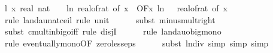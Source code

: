 \begin{isabellebody}
\ l{}{\isacharcolon}{\kern0pt}\ {\isachardoublequoteopen}{\isacharparenleft}{\kern0pt}{\isasymlambda}x{\isachardot}{\kern0pt}\ real\ {\isacharparenleft}{\kern0pt}nat\ {\isasymlceil}{\isacharminus}{\kern0pt}\ {\isacharparenleft}{\kern0pt}{}{}\ {\isacharasterisk}{\kern0pt}\ ln\ {\isacharparenleft}{\kern0pt}real{\isacharunderscore}{\kern0pt}of{\isacharunderscore}{\kern0pt}rat\ {\isacharparenleft}{\kern0pt}{\isasymepsilon}{\isacharunderscore}{\kern0pt}of\ x{\isacharparenright}{\kern0pt}{\isacharparenright}{\kern0pt}{\isacharparenright}{\kern0pt}{\isasymrceil}{\isacharparenright}{\kern0pt}{\isacharparenright}{\kern0pt}\ {\isasymin}\ O{\isacharbrackleft}{\kern0pt}{\isacharquery}{\kern0pt}F{\isacharbrackright}{\kern0pt}{\isacharparenleft}{\kern0pt}{\isasymlambda}x{\isachardot}{\kern0pt}\ ln\ {\isacharparenleft}{\kern0pt}{}\ {\isacharslash}{\kern0pt}\ real{\isacharunderscore}{\kern0pt}of{\isacharunderscore}{\kern0pt}rat\ {\isacharparenleft}{\kern0pt}{\isasymepsilon}{\isacharunderscore}{\kern0pt}of\ x{\isacharparenright}{\kern0pt}{\isacharparenright}{\kern0pt}{\isacharparenright}{\kern0pt}{\isachardoublequoteclose}\isanewline
\ \ \ \ \isamarkupfalse%
\ {\isacharparenleft}{\kern0pt}rule\ landau{\isacharunderscore}{\kern0pt}nat{\isacharunderscore}{\kern0pt}ceil{\isacharcomma}{\kern0pt}\ rule\ unit{\isacharunderscore}{\kern0pt}{}{\isacharparenright}{\kern0pt}\isanewline
\ \ \ \ \isamarkupfalse%
\ {\isacharparenleft}{\kern0pt}subst\ minus{\isacharunderscore}{\kern0pt}mult{\isacharunderscore}{\kern0pt}right{\isacharparenright}{\kern0pt}\isanewline
\ \ \ \ \isamarkupfalse%
\ {\isacharparenleft}{\kern0pt}subst\ cmult{\isacharunderscore}{\kern0pt}in{\isacharunderscore}{\kern0pt}bigo{\isacharunderscore}{\kern0pt}iff{\isacharcomma}{\kern0pt}\ rule\ disjI{}{\isacharparenright}{\kern0pt}\isanewline
\ \ \ \ \isamarkupfalse%
\ {\isacharparenleft}{\kern0pt}rule\ landau{\isacharunderscore}{\kern0pt}o{\isachardot}{\kern0pt}big{\isacharunderscore}{\kern0pt}mono{\isacharparenright}{\kern0pt}\isanewline
\ \ \ \ \isamarkupfalse%
\ {\isacharparenleft}{\kern0pt}rule\ eventually{\isacharunderscore}{\kern0pt}mono{\isacharbrackleft}{\kern0pt}OF\ zero{\isacharunderscore}{\kern0pt}less{\isacharunderscore}{\kern0pt}eps{\isacharbrackright}{\kern0pt}{\isacharparenright}{\kern0pt}\isanewline
\ \ \ \ \isamarkupfalse%
\ {\isacharparenleft}{\kern0pt}subst\ ln{\isacharunderscore}{\kern0pt}div{\isacharcomma}{\kern0pt}\ simp{\isacharcomma}{\kern0pt}\ simp{\isacharcomma}{\kern0pt}\ simp{\isacharparenright}{\kern0pt}\isanewline

\end{isabellebody}
